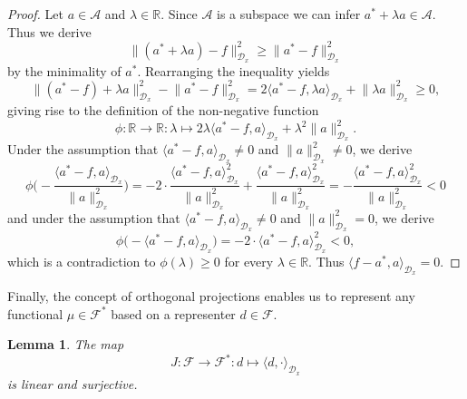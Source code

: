 \documentclass[11pt, a4paper]{article}
\newtheorem{lemma}[theorem]{Lemma}
\newcommand{\R}{\mathbb{R}}
\newcommand{\A}{\mathcal{A}}
\newcommand{\D}{\mathcal{D}}
\newcommand{\F}{\mathcal{F}}
\begin{document}
\begin{proof}
Let $a \in \A$ and $\lambda \in \R$. Since $\A$ is a subspace we can infer $a^* + \lambda a \in \A$. Thus we derive
\[ \big \| (a^* + \lambda a) -f \big \|_{\D_x}^2 \geq \big \| a^* - f \big \|_{\D_x}^2 \]
by the minimality of $a^*$. Rearranging the inequality yields
\[ \big \| (a^* - f) + \lambda a \big \|_{\D_x} ^2 - \big \| a^* - f \big \|_{\D_x}^2 = 2 \big \langle a^* -f , \lambda a \big \rangle_{\D_x} + \big \| \lambda a \big \|_{\D_x}^2 \geq 0, \]
giving rise to the definition of the non-negative function
\[ \phi : \R \to \R : \lambda \mapsto 2 \lambda \big \langle a^* -f , a \big \rangle_{\D_x} + \lambda^2 \big \| a \big \|_{\D_x}^2. \]
Under the assumption that $\big \langle a^* - f , a \big \rangle_{\D_x} \neq 0$ and $\| a \|_{\D_x}^2 \neq 0$, we derive
\[ \phi \Big ( - \frac{ \big \langle a^* - f , a \big \rangle_{\D_x}}{\| a \|_{\D_x}^2} \Big ) = -2 \cdot \frac{ \big \langle a^* - f , a \big \rangle_{\D_x}^2}{ \| a \|_{\D_x}^2} + \frac{\big \langle a^* - f , a \big \rangle_{\D_x}^2}{ \| a \|_{\D_x}^2} = - \frac{ \big \langle a^* - f , a \big \rangle_{\D_x}^2}{ \| a \|_{\D_x}^2} < 0 \]
and under the assumption that $\big \langle a^* - f, a \big \rangle_{\D_x} \neq 0$ and $\| a \|_{\D_x}^2 = 0$, we derive
\[ \phi \Big ( -  \big \langle a^* - f , a \big \rangle_{\D_x} \Big ) = -2 \cdot \big \langle a^* - f , a \big \rangle_{\D_x}^2 < 0, \]
which is a contradiction to $\phi(\lambda) \geq 0$ for every $\lambda \in \R$. Thus $ \big \langle f - a^* , a \big \rangle_{\D_x} = 0$.
\end{proof}

Finally, the concept of orthogonal projections enables us to represent any functional $\mu \in \F^*$ based on a representer $d \in \F$.

\begin{lemma} \label{lem:riesz}
The map
\[ J: \F \to \F^* : d \mapsto \langle d, \cdot \rangle_{\D_x} \]
is linear and surjective.
\end{lemma}
\end{document}
